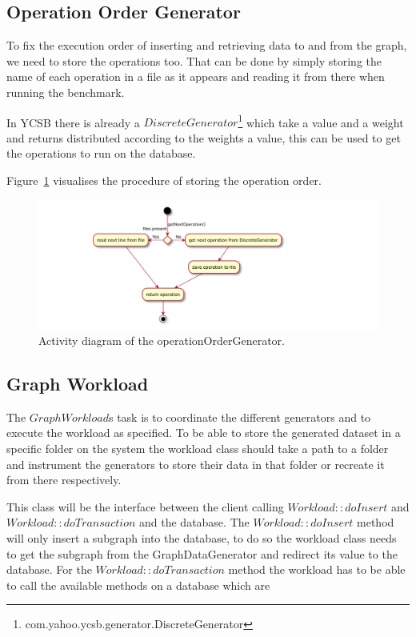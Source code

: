 \subsection{Operation Order Generator}
\label{ch:design:se:operationOrderGenerator}
To fix the execution order of inserting and retrieving data to and from the graph,
we need to store the operations too.
That can be done by simply storing the name of each operation in a file as it appears and reading it from there when running the benchmark.

In YCSB there is already a $ DiscreteGenerator $\footnote{com.yahoo.ycsb.generator.DiscreteGenerator} which take a value and a weight and returns distributed according to the weights a value,
this can be used to get the operations to run on the database.

Figure~\ref{fig:operationOrderGenerator} visualises the procedure of storing the operation order.

\begin{figure}
  \includegraphics{images/extensions/OperationOrderGenerator}
  \caption{Activity diagram of the operationOrderGenerator.\todo{}}
  \label{fig:operationOrderGenerator}
\end{figure}

\subsection{Graph Workload}
The $ GraphWorkload $s task is to coordinate the different generators and to execute the workload as specified.
To be able to store the generated dataset in a specific folder on the system the workload class should take a path to a folder and instrument the generators to store their data in that folder or recreate it from there respectively.

This class will be the interface between the client calling $ Workload::doInsert $ and $ Workload::doTransaction $ and the database.
The $ Workload::doInsert $ method will only insert a subgraph into the database,
to do so the workload class needs to get the subgraph from the GraphDataGenerator and redirect its value to the database.
For the $ Workload::doTransaction $ method the workload has to be able to call the available methods on a database which are

